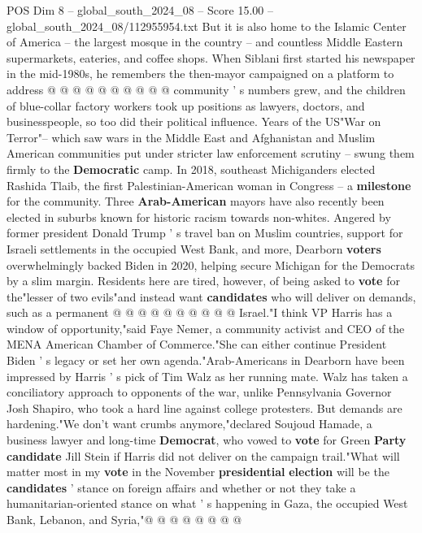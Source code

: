 \begin{textsample}{POS Dim 8 – global\_south\_2024\_08 – Score 15.00 – global\_south\_2024\_08/112955954.txt}
But it is also home to the Islamic Center of America -- the largest mosque in the country -- and countless Middle Eastern supermarkets, eateries, and coffee shops.
When Siblani first started his newspaper in the mid-1980s, he remembers the then-mayor campaigned on a platform to address @ @ @ @ @ @ @ @ @ @ community ' s numbers grew, and the children of blue-collar factory workers took up positions as lawyers, doctors, and businesspeople, so too did their political influence.
Years of the US"War on Terror"-- which saw wars in the Middle East and Afghanistan and Muslim American communities put under stricter law enforcement scrutiny -- swung them firmly to the \textbf{Democratic} camp.
In 2018, southeast Michiganders elected Rashida Tlaib, the first Palestinian-American woman in Congress -- a \textbf{milestone} for the community.
Three \textbf{Arab-American} mayors have also recently been elected in suburbs known for historic racism towards non-whites.
Angered by former president Donald Trump ' s travel ban on Muslim countries, support for Israeli settlements in the occupied West Bank, and more, Dearborn \textbf{voters} overwhelmingly backed Biden in 2020, helping secure Michigan for the Democrats by a slim margin.
Residents here are tired, however, of being asked to \textbf{vote} for the"lesser of two evils"and instead want \textbf{candidates} who will deliver on demands, such as a permanent @ @ @ @ @ @ @ @ @ @ Israel."I think VP Harris has a window of opportunity,"said Faye Nemer, a community activist and CEO of the MENA American Chamber of Commerce."She can either continue President Biden ' s legacy or set her own agenda."Arab-Americans in Dearborn have been impressed by Harris ' s pick of Tim Walz as her running mate.
Walz has taken a conciliatory approach to opponents of the war, unlike Pennsylvania Governor Josh Shapiro, who took a hard line against college protesters.
But demands are hardening."We don't want crumbs anymore,"declared Soujoud Hamade, a business lawyer and long-time \textbf{Democrat}, who vowed to \textbf{vote} for Green \textbf{Party} \textbf{candidate} Jill Stein if Harris did not deliver on the campaign trail."What will matter most in my \textbf{vote} in the November \textbf{presidential} \textbf{election} will be the \textbf{candidates} ' stance on foreign affairs and whether or not they take a humanitarian-oriented stance on what ' s happening in Gaza, the occupied West Bank, Lebanon, and Syria,"@ @ @ @ @ @ @ @

\end{textsample}

